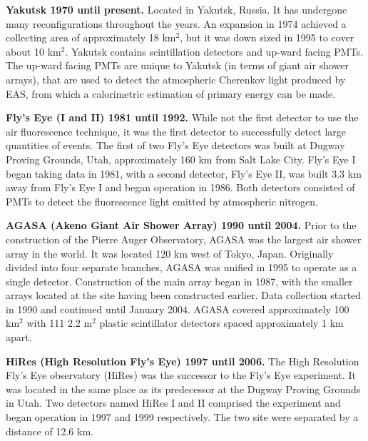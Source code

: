 \noindent \textbf{Yakutsk 1970 until present.} Located in Yakutsk, Russia. It has undergone many reconfigurations throughout the years. An expansion in 1974 achieved a collecting area of approximately 18 km$^2$, but it was down sized in 1995 to cover about 10 km$^2$. Yakutsk contains scintillation detectors and up-ward facing PMTs. The up-ward facing PMTs are unique to Yakutsk (in terms of giant air shower arrays), that are used to detect the atmospheric Cherenkov light produced by EAS, from which a calorimetric estimation of primary energy can be made.
					
\noindent \textbf{Fly's Eye (I and II) 1981 until 1992.} While not the first detector to use the air fluorescence technique, it was the first detector to successfully detect large quantities of events. The first of two Fly's Eye detectors was built at Dugway Proving Grounds, Utah, approximately 160 km from Salt Lake City. Fly's Eye I began taking data in 1981, with a second detector, Fly's Eye II, was built 3.3 km away from Fly's Eye I and began operation in 1986. Both detectors consisted of PMTs to detect the fluorescence light emitted by atmospheric nitrogen. 
					
\noindent \textbf{AGASA (Akeno Giant Air Shower Array) 1990 until 2004.} Prior to the construction of the Pierre Auger Observatory, AGASA was the largest air shower array in the world. It was located 120 km west of Tokyo, Japan. Originally divided into four separate branches, AGASA was unified in 1995 to operate as a single detector. Construction of the main array began in 1987, with the smaller arrays located at the site having been constructed earlier. Data collection started in 1990 and continued until January 2004. AGASA covered approximately 100 km$^2$ with 111 2.2 m$^2$ plastic scintillator detectors spaced approximately 1 km apart.
					
\noindent \textbf{HiRes (High Resolution Fly's Eye) 1997 until 2006.} The High Resolution Fly's Eye observatory (HiRes) was the successor to the Fly's Eye experiment. It was located in the same place as its predecessor at the Dugway Proving Grounds in Utah. Two detectors named HiRes I and II comprised the experiment and began operation in 1997 and 1999 respectively. The two site were separated by a distance of 12.6 km.